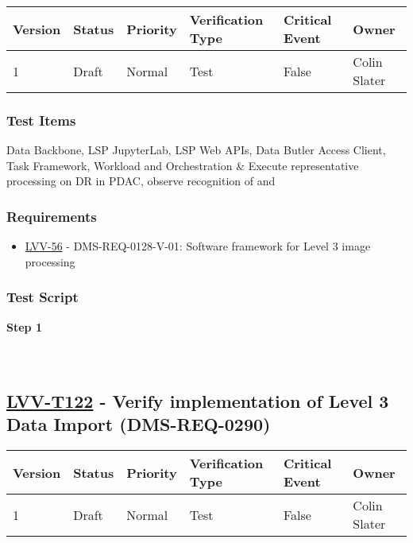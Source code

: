 \begin{longtable}[]{@{}llllll@{}}
\toprule
Version & Status & Priority & Verification Type & Critical Event &
Owner\tabularnewline
\midrule
\endhead
1 & Draft & Normal & Test & False & Colin Slater\tabularnewline
\bottomrule
\end{longtable}

\hypertarget{test-items-21}{%
\subsubsection{Test Items}\label{test-items-21}}

Data Backbone, LSP JupyterLab, LSP Web APIs, Data Butler Access Client,
Task Framework, Workload and Orchestration \& Execute representative
processing on DR in PDAC, observe recognition of and

\hypertarget{requirements-21}{%
\subsubsection{Requirements}\label{requirements-21}}

\begin{itemize}
\tightlist
\item
  \href{https://jira.lsstcorp.org/browse/LVV-56}{LVV-56} -
  DMS-REQ-0128-V-01: Software framework for Level 3 image processing
\end{itemize}

\hypertarget{test-script-21}{%
\subsubsection{Test Script}\label{test-script-21}}

\textbf{Step 1}\\
~\\
~\\

\hypertarget{lvv-t122---verify-implementation-of-level-3-data-import-dms-req-0290}{%
\subsection{\texorpdfstring{\href{https://jira.lsstcorp.org/secure/Tests.jspa\#/testCase/LVV-T122}{LVV-T122}
- Verify implementation of Level 3 Data Import
(DMS-REQ-0290)}{LVV-T122 - Verify implementation of Level 3 Data Import (DMS-REQ-0290)}}\label{lvv-t122---verify-implementation-of-level-3-data-import-dms-req-0290}}

\begin{longtable}[]{@{}llllll@{}}
\toprule
Version & Status & Priority & Verification Type & Critical Event &
Owner\tabularnewline
\midrule
\endhead
1 & Draft & Normal & Test & False & Colin Slater\tabularnewline
\bottomrule
\end{longtable}

